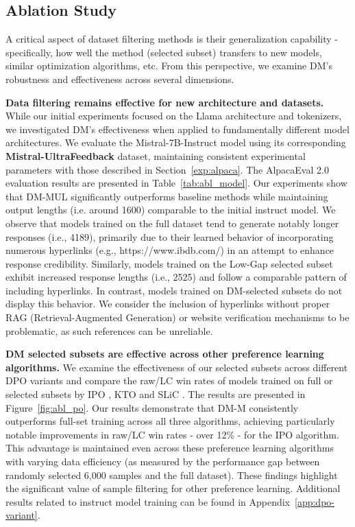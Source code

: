 {\subsection{Ablation Study}
\label{exp:ablation}

 A critical aspect of dataset filtering methods is their generalization capability - specifically, how well the method (selected subset) transfers to new models, similar optimization algorithms, etc. From this perspective, we examine DM's robustness and effectiveness across several dimensions.



\textbf{Data filtering remains effective for new architecture and datasets.} While our initial experiments focused on the Llama architecture and tokenizers, we investigated DM's effectiveness when applied to fundamentally different model architectures. We evaluate the Mistral-7B-Instruct model using its corresponding \textbf{Mistral-UltraFeedback} dataset, maintaining consistent experimental parameters with those described in Section~\ref{exp:alpaca}. The AlpacaEval 2.0 evaluation results are presented in Table~\ref{tab:abl_model}. Our experiments show that DM-MUL significantly outperforms baseline methods while maintaining output lengths (i.e. around 1600) comparable to the initial instruct model. We observe that models trained on the full dataset tend to generate notably longer responses (i.e., 4189), primarily due to their learned behavior of incorporating numerous hyperlinks (e.g., https://www.ibdb.com/) in an attempt to enhance response credibility. Similarly, models trained on the Low-Gap selected subset exhibit increased response lengths (i.e., 2525) and follow a comparable pattern of including hyperlinks. In contrast, models trained on DM-selected subsets do not display this behavior. We consider the inclusion of hyperlinks without proper RAG (Retrieval-Augmented Generation) \citep{lewis2020retrieval} or website verification mechanisms to be problematic, as such references can be unreliable.


\textbf{DM selected subsets are effective across other preference learning algorithms.} We examine the effectiveness of our selected subsets across different DPO variants and compare the raw/LC win rates of models trained on full or selected subsets by IPO \citep{azar2024general}, KTO \citep{ethayarajh2024kto} and SLiC \citep{zhao2023slic}. The results are presented in Figure~\ref{fig:abl_po}. Our results demonstrate that DM-M consistently outperforms full-set training across all three algorithms, achieving particularly notable improvements in raw/LC win rates - over 12\% - for the IPO algorithm. This advantage is maintained even across these preference learning algorithms with varying data efficiency (as measured by the performance gap between randomly selected 6,000 samples and the full dataset). These findings highlight the significant value of sample filtering for other preference learning. Additional results related to instruct model training can be found in Appendix~\ref{app:dpo-variant}.

}
